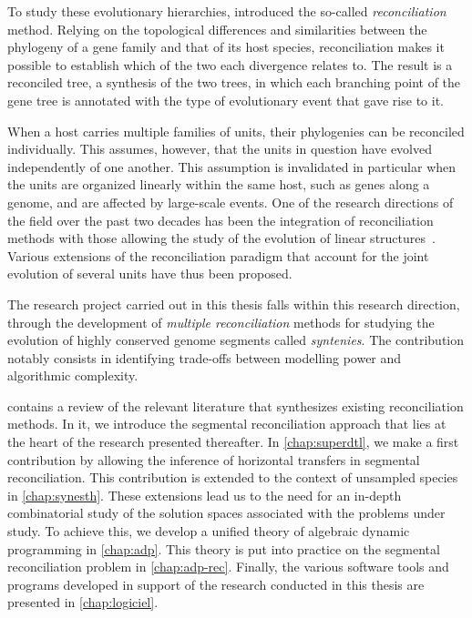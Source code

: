 To study these evolutionary hierarchies, \textcite{Goodman1979FittingGeneLineage} introduced the so-called \emph{reconciliation} method.
Relying on the topological differences and similarities between the phylogeny of a gene family and that of its host species, reconciliation makes it possible to establish which of the two each divergence relates to.
The result is a reconciled tree, a synthesis of the two trees, in which each branching point of the gene tree is annotated with the type of evolutionary event that gave rise to it.

When a host carries multiple families of units, their phylogenies can be reconciled individually.
This assumes, however, that the units in question have evolved independently of one another.
This assumption is invalidated in particular when the units are organized linearly within the same host, such as genes along a genome, and are affected by large-scale events.
One of the research directions of the field over the past two decades has been the integration of reconciliation methods with those allowing the study of the evolution of linear structures~\parencite{Sankoff2000DuplicationRearrangementReconciliation}.
Various extensions of the reconciliation paradigm that account for the joint evolution of several units have thus been proposed.

The research project carried out in this thesis falls within this research direction, through the development of \emph{multiple reconciliation} methods for studying the evolution of highly conserved genome segments called \emph{syntenies}.
The contribution notably consists in identifying trade-offs between modelling power and algorithmic complexity.

 contains a review of the relevant literature that synthesizes existing reconciliation methods.
In it, we introduce the segmental reconciliation approach that lies at the heart of the research presented thereafter.
In \cref{chap:superdtl}, we make a first contribution by allowing the inference of horizontal transfers in segmental reconciliation.
This contribution is extended to the context of unsampled species in \cref{chap:synesth}.
These extensions lead us to the need for an in-depth combinatorial study of the solution spaces associated with the problems under study.
To achieve this, we develop a unified theory of algebraic dynamic programming in \cref{chap:adp}.
This theory is put into practice on the segmental reconciliation problem in \cref{chap:adp-rec}.
Finally, the various software tools and programs developed in support of the research conducted in this thesis are presented in \cref{chap:logiciel}.
